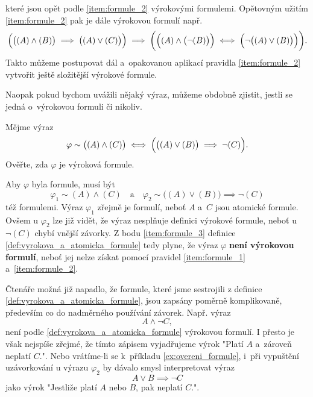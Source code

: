 které jsou opět podle \ref{item:formule_2} výrokovými formulemi. Opětovným užitím \ref{item:formule_2} pak je dále výrokovou formulí např.
\begin{equation*}
    \Bigl(\bigl((A) \land (B)\bigr) \implies \bigl((A) \lor (C)\bigr)\Bigr) \implies \bigg(\Bigl((A) \land \bigl(\neg(B)\bigr)\Bigr) \iff \Bigl(\neg\bigl((A) \lor (B)\bigr)\Bigr)\bigg).
\end{equation*}
Takto můžeme postupovat dál a~opakovanou aplikací pravidla \ref{item:formule_2} vytvořit ještě složitější výrokové formule.\par
Naopak pokud bychom uvážili nějaký výraz, můžeme obdobně zjistit, jestli se jedná o~výrokovou formuli či nikoliv.
\begin{example}\label{ex:overeni_formule}
    Mějme výraz
    \begin{equation*}
        \varphi\sim\bigl((A) \land (C)\bigr) \iff \Bigl(\bigl((A) \lor (B)\bigr) \implies \neg(C)\Bigr).
    \end{equation*}
    Ověřte, zda $\varphi$ je výroková formule.\par
    \begin{solution}
        Aby $\varphi$ byla formule, musí být
        \begin{equation*}
            \varphi_1\sim(A) \land (C)\quad\text{a}\quad\varphi_2\sim\bigl((A) \lor (B)\bigr) \implies \neg(C)
        \end{equation*}
        též formulemi. Výraz $\varphi_1$ zřejmě je formulí, neboť $A$ a~$C$ jsou atomické formule. Ovšem u $\varphi_2$ lze již vidět, že výraz nesplňuje definici výrokové formule, neboť u $\neg(C)$ chybí vnější závorky. Z bodu \ref{item:formule_3} definice \ref{def:vyrokova_a_atomicka_formule} tedy plyne, že výraz $\varphi$ \textbf{není výrokovou formulí}, neboť jej nelze získat pomocí pravidel \ref{item:formule_1} a~\ref{item:formule_2}.
    \end{solution}
\end{example}

Čtenáře možná již napadlo, že formule, které jsme sestrojili z definice \ref{def:vyrokova_a_atomicka_formule}, jsou zapsány poměrně komplikovaně, především co do nadměrného používání závorek. Např. výraz
\begin{equation}\label{eq:poradi_operaci}
    A \land \neg C,
\end{equation}
není podle \ref{def:vyrokova_a_atomicka_formule} výrokovou formulí. I přesto je však nejspíše zřejmé, že tímto zápisem vyjadřujeme výrok "Platí $A$ a~zároveň neplatí $C$.". Nebo vrátíme-li se k~příkladu \ref{ex:overeni_formule}, i~při vypuštění uzávorkování u výrazu $\varphi_2$ by dávalo smysl interpretovat výraz
\begin{equation*}\label{eq:vypusteni_uzavorkovani}
    A \lor B \implies \neg C
\end{equation*}
jako výrok "Jestliže platí $A$ nebo $B$, pak neplatí $C$.".